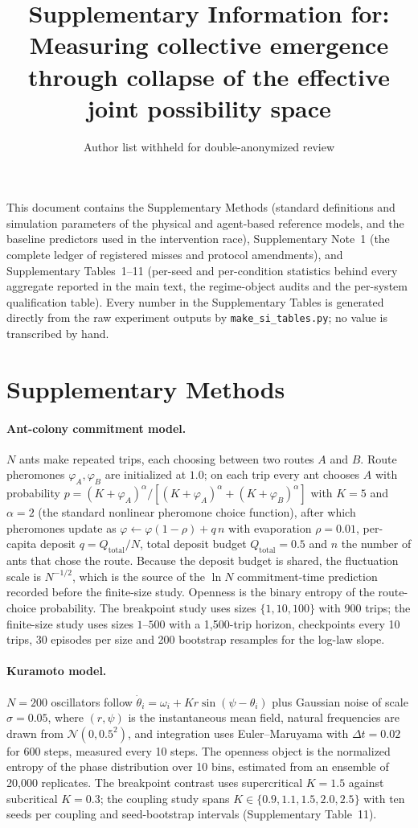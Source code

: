 \documentclass[11pt]{article}
\title{\vspace{-1.5em}\bfseries Supplementary Information for:\\
Measuring collective emergence through collapse of the effective
joint possibility space}
\author{Author list withheld for double-anonymized review}
\date{}
\begin{document}
\maketitle
\thispagestyle{empty}

\noindent This document contains the Supplementary Methods (standard
definitions and simulation parameters of the physical and agent-based
reference models, and the baseline predictors used in the intervention
race), Supplementary Note~1 (the complete ledger of registered misses
and protocol amendments), and Supplementary Tables~1--11 (per-seed and
per-condition statistics behind every aggregate reported in the main
text, the regime-object audits and the per-system qualification
table). Every number in the Supplementary Tables is generated directly
from the raw experiment outputs by \texttt{make\_si\_tables.py}; no
value is transcribed by hand.

\section*{Supplementary Methods}

\paragraph{Ant-colony commitment model.}
$N$ ants make repeated trips, each choosing between two routes $A$ and
$B$. Route pheromones $\varphi_A,\varphi_B$ are initialized at $1.0$;
on each trip every ant chooses $A$ with probability
$p=(K+\varphi_A)^{\alpha}/[(K+\varphi_A)^{\alpha}+(K+\varphi_B)^{\alpha}]$
with $K=5$ and $\alpha=2$ (the standard nonlinear pheromone choice
function), after which pheromones update as
$\varphi\leftarrow\varphi(1-\rho)+q\,n$ with evaporation $\rho=0.01$,
per-capita deposit $q=Q_{\mathrm{total}}/N$, total deposit budget
$Q_{\mathrm{total}}=0.5$ and $n$ the number of ants that chose the
route. Because the deposit budget is shared, the fluctuation scale is
$N^{-1/2}$, which is the source of the $\ln N$ commitment-time
prediction recorded before the finite-size study. Openness is the
binary entropy of the route-choice probability. The breakpoint study
uses sizes $\{1,10,100\}$ with 900 trips; the finite-size study uses
sizes $1$--$500$ with a 1{,}500-trip horizon, checkpoints every 10
trips, 30 episodes per size and 200 bootstrap resamples for the
log-law slope.

\paragraph{Kuramoto model.}
$N=200$ oscillators follow
$\dot{\theta}_i=\omega_i+Kr\sin(\psi-\theta_i)$ plus Gaussian noise of
scale $\sigma=0.05$, where $(r,\psi)$ is the instantaneous mean field,
natural frequencies are drawn from $\mathcal{N}(0,0.5^2)$, and
integration uses Euler--Maruyama with $\Delta t=0.02$ for 600 steps,
measured every 10 steps. The openness object is the normalized entropy
of the phase distribution over 10 bins, estimated from an ensemble of
20{,}000 replicates. The breakpoint contrast uses supercritical
$K=1.5$ against subcritical $K=0.3$; the coupling study spans
$K\in\{0.9,1.1,1.5,2.0,2.5\}$ with ten seeds per coupling and
seed-bootstrap intervals (Supplementary Table~11).
\end{document}
